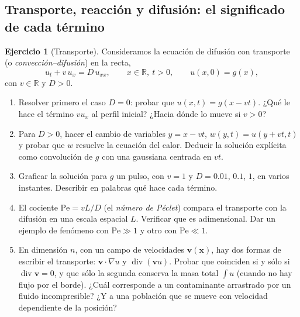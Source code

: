 \documentclass[12pt, a4paper]{amsbook}
\def\div{\operatorname {\mathrm{div}}}
\newcommand{\R}{{\mathbb R}}
\newcommand{\vv}{{\mathbf v}}
\newcommand{\xx}{{\mathbf x}}
\theoremstyle{remark}
\theoremstyle{definition}
\newtheorem{ejer}[teo]{Ejercicio}
\numberwithin{section}{chapter}
\numberwithin{subsection}{section}
\numberwithin{equation}{section}
\numberwithin{figure}{chapter}
\begin{document}
\subsection*{Transporte, reacción y difusión: el significado de cada término}

\begin{ejer}[Transporte]\label{ejer:transporte}
Consideramos la ecuación de difusión con transporte (o \emph{convección--difusión}) en la recta,
$$
u_t + v\,u_x = D\,u_{xx},\qquad x\in\R,\ t>0,\qquad u(x,0) = g(x),
$$
con $v\in\R$ y $D>0$.
\begin{enumerate}
\item Resolver primero el caso $D=0$: probar que $u(x,t) = g(x-vt)$. ¿Qué le hace el término $v u_x$ al perfil inicial? ¿Hacia dónde lo mueve si $v>0$?
\item Para $D>0$, hacer el cambio de variables $y = x-vt$, $w(y,t) = u(y+vt,t)$ y probar que $w$ resuelve la ecuación del calor. Deducir la solución explícita como convolución de $g$ con una gaussiana centrada en $vt$.
\item Graficar la solución para $g$ un pulso, con $v=1$ y $D=0.01$, $0.1$, $1$, en varios instantes. Describir en palabras qué hace cada término.
\item El cociente $\mathrm{Pe} = vL/D$ (el \emph{número de Péclet}) compara el transporte con la difusión en una escala espacial $L$. Verificar que es adimensional. Dar un ejemplo de fenómeno con $\mathrm{Pe}\gg 1$ y otro con $\mathrm{Pe}\ll 1$.
\item En dimensión $n$, con un campo de velocidades $\vv(\xx)$, hay dos formas de escribir el transporte: $\vv\cdot\nabla u$ y $\div(\vv u)$. Probar que coinciden si y sólo si $\div\vv = 0$, y que sólo la segunda conserva la masa total $\int u$ (cuando no hay flujo por el borde). ¿Cuál corresponde a un contaminante arrastrado por un fluido incompresible? ¿Y a una población que se mueve con velocidad dependiente de la posición?
\end{enumerate}
\end{ejer}
\end{document}
